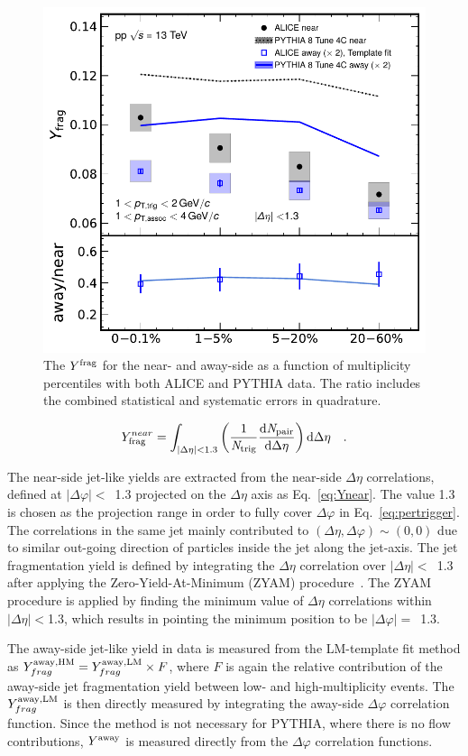 \begin{figure}[!th]
	\centering
	\includegraphics[width=0.6 \textwidth]{figures/Fig5_Plot_v2Mult.pdf} 
	\caption{The $Y^{\rm{frag}}$ for the near- and away-side as a function of multiplicity percentiles with both ALICE and PYTHIA data. The ratio includes the combined statistical and systematic errors in quadrature.}
	\label{fig:Ymult}
\end{figure}

\begin{eqnarray}
Y^{near}_{\rm{frag}} = \int_{|\Delta \eta|<1.3} \left( \frac{1}{\it{N}_{\rm{trig}}} \frac{ \rm{d}\it{}N_{\rm{pair}} }{ \rm{d}\Delta\eta } \right) \rm{d} \Delta\eta \quad.
\label{eq:Ynear}
\end{eqnarray}
  
The near-side jet-like yields are extracted from the near-side $\Delta\eta$ correlations, defined at $|\Delta\varphi|<$~1.3 projected on the $\Delta\eta$ axis as Eq.~\ref{eq:Ynear}. The value 1.3 is chosen as the projection range in order to fully cover $\Delta\varphi$ in Eq.~\ref{eq:pertrigger}.
The correlations in the same jet mainly contributed to $(\Delta\eta, \Delta\varphi) \sim (0,0)$ due to similar out-going direction of particles inside the jet along the jet-axis. The jet fragmentation yield is defined by integrating the $\Delta\eta$ correlation over $|\Delta\eta|<$~1.3 after applying the Zero-Yield-At-Minimum (ZYAM) procedure~\cite{Ajitanand:2005jj}. The ZYAM procedure is applied by finding the minimum value of $\Delta\eta$ correlations within $|\Delta\eta|<$1.3, which results in pointing the minimum position to be $|\Delta\varphi|=$~1.3.

The away-side jet-like yield in data is measured from the LM-template fit method as $Y^{\rm{away, HM}}_{frag} = Y^{\rm{away, LM}}_{frag} \times F$, where $F$ is again the relative contribution of the away-side jet fragmentation yield between low- and high-multiplicity events. The $Y^{\rm{away, LM}}_{frag}$ is then directly measured by integrating the away-side $\Delta\varphi$ correlation function. Since the method is not necessary for PYTHIA, where there is no flow contributions, $Y^{\rm{away}}$ is measured directly from the $\Delta\varphi$ correlation functions.

